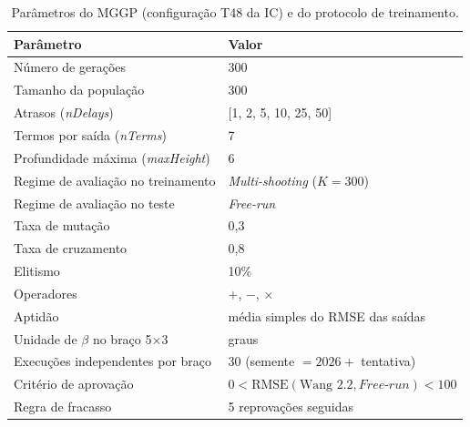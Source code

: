 \begin{table}[htbp]
    \centering
    \caption{Parâmetros do MGGP (configuração T48 da IC) e do protocolo de treinamento.}
    \label{tab:parametros}
    \small
    \begin{tabular}{ll}
        \toprule
        \textbf{Parâmetro} & \textbf{Valor} \\
        \midrule
        Número de gerações & 300 \\
        Tamanho da população & 300 \\
        Atrasos (\textit{nDelays}) & [1, 2, 5, 10, 25, 50] \\
        Termos por saída (\textit{nTerms}) & 7 \\
        Profundidade máxima (\textit{maxHeight}) & 6 \\
        Regime de avaliação no treinamento & \textit{Multi-shooting} ($K = 300$) \\
        Regime de avaliação no teste & \textit{Free-run} \\
        Taxa de mutação & 0,3 \\
        Taxa de cruzamento & 0,8 \\
        Elitismo & 10\% \\
        Operadores & $+$, $-$, $\times$ \\
        Aptidão & média simples do RMSE das saídas \\
        Unidade de $\beta$ no braço 5×3 & graus \\
        Execuções independentes por braço & 30 (semente $= 2026 +$ tentativa) \\
        Critério de aprovação & $0 < \mathrm{RMSE}(\text{Wang 2.2}, \textit{Free-run}) < 100$ \\
        Regra de fracasso & 5 reprovações seguidas \\
        \bottomrule
    \end{tabular}
\end{table}
